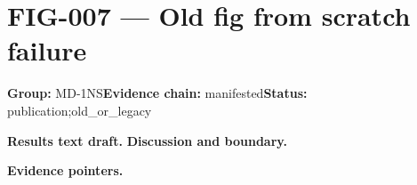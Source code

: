 \clearpage
\section{FIG-007 --- Old fig from scratch failure}
\label{figpage:fig-007}
\textbf{Group:} MD-1NS\quad \textbf{Evidence chain:} manifested\quad \textbf{Status:} publication;old\_or\_legacy

\textbf{Results text draft.} 
\textbf{Discussion and boundary.} 


\textbf{Evidence pointers.}



\vfill
